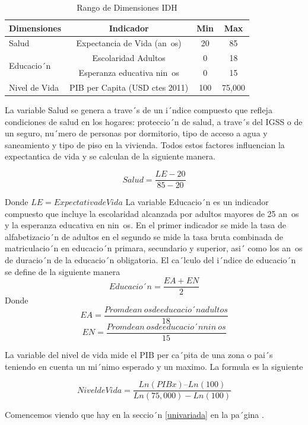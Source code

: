 \documentclass{article}
\begin{document}

\begin{table}[h!]
\centering
  \begin{tabular}{l c c c}
  \hline
  Dimensiones & Indicador & Min & Max \\ [0.25ex]
  \hline \hline
  Salud & Expectancia de Vida (an~os) & 20 & 85 \\
  \multirow{2}{*}{Educacio´n} & Escolaridad Adultos & 0 & 18 \\ 
   & Esperanza educativa nin~os & 0 & 15 \\
  Nivel de Vida  & PIB per Capita (USD ctes 2011) & 100 & 75,000 \\
  \hline
  \end{tabular}
 \caption {Rango de Dimensiones IDH}
  \label{Tabla 1:}
\end {table} 

La variable Salud se genera a trave´s de un i´ndice compuesto que refleja condiciones de salud en los hogares: proteccio´n de salud, a trave´s del IGSS o de un seguro, nu´mero de personas por dormitorio, tipo de acceso a agua y saneamiento y tipo de piso en la vivienda. Todos estos factores influencian la expectantica de vida y se calculan de la siguiente manera.

\[ Salud=\frac{LE-20} {85-20} \]

Donde $LE = Expectativa de Vida$
La variable Educacio´n es un indicador compuesto que incluye la escolaridad alcanzada por adultos mayores de 25 an~os y la esperanza educativa en nin~os. En el primer indicador se mide la tasa de alfabetizacio´n de adultos en el segundo se mide la tasa bruta combinada de matriculacio´n en educacio´n primara, secundario y superior, asi´ como los an~os de duracio´n de la educacio´n obligatoria. El ca´lculo del i´ndice de educacio´n se define de la siguiente manera
\[Educacio´n= \frac{EA + EN} {2} \]
Donde
\[EA= \frac{Prom de an~os de educacio´n adultos} {18}  \]
\[EN= \frac{Prom de an~os de educacio´n nin~os} {15}  \]

La variable del nivel de vida mide el PIB per ca´pita de una zona o pai´s teniendo en cuenta un mi´nimo esperado y un maximo. La formula es la siguiente

\[Nivel de Vida = \frac {Ln(PIBx) – Ln (100)} {Ln(75,000)-Ln(100)} \]





Comencemos viendo que hay en la seccio´n \ref{univariada} en la pa´gina \pageref{univariada}.

\clearpage


\clearpage




%
%
\end{document}
